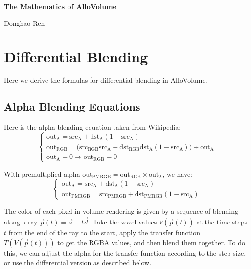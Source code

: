 \documentclass[letter, 11pt]{article}
\newcommand{\mtitle}{The Mathematics of AlloVolume}
\newcommand{\mauthor}{Donghao Ren}
\begin{document}
\thispagestyle{fancy}

\centerline{\Large\textbf{\mtitle}}
\vspace{0.1in}
\centerline{\large{\mauthor}}

\setlength{\parindent}{0cm}

\section{Differential Blending}

Here we derive the formulas for differential blending in AlloVolume.

\subsection{Alpha Blending Equations}

Here is the alpha blending equation taken from Wikipedia:
\begin{equation*}
\begin{cases}
\mathrm{out}_{\mathrm{A}} = \mathrm{src}_{\mathrm{A}} + \mathrm{dst}_{\mathrm{A}} (1 - \mathrm{src}_{\mathrm{A}}) \\
\mathrm{out}_{\mathrm{RGB}} = \bigl( \mathrm{src}_{\mathrm{RGB}} \mathrm{src}_{\mathrm{A}} + \mathrm{dst}_{\mathrm{RGB}} \mathrm{dst}_{\mathrm{A}} \left( 1 - \mathrm{src}_{\mathrm{A}} \right) \bigr) \div \mathrm{out}_{\mathrm{A}} \\
\mathrm{out}_{\mathrm{A}} = 0 \Rightarrow \mathrm{out}_{\mathrm{RGB}} = 0
\end{cases}
\end{equation*}

With premultiplied alpha $ \mathrm{out}_{\mathrm{PMRGB}} = \mathrm{out}_{\mathrm{RGB}} \times \mathrm{out}_{\mathrm{A}} $, we have:
\begin{equation*}
\begin{cases}
\mathrm{out}_{\mathrm{A}} = \mathrm{src}_{\mathrm{A}} + \mathrm{dst}_{\mathrm{A}} (1 - \mathrm{src}_{\mathrm{A}}) \\
\mathrm{out}_{\mathrm{PMRGB}} = \mathrm{src}_{\mathrm{PMRGB}} + \mathrm{dst}_{\mathrm{PMRGB}} \left( 1 - \mathrm{src}_{\mathrm{A}} \right)
\end{cases}
\end{equation*}

The color of each pixel in volume rendering is given by a sequence of blending along a ray $\vec{p}(t) = \vec{s} + t \vec{d}$.
Take the voxel values $V(\vec{p}(t))$ at the time steps $t$ from the end of the ray to the start,
apply the transfer function $T(V(\vec{p}(t)))$ to get the RGBA values, and then blend them together.
To do this, we can adjust the alpha for the transfer function according to the step size,
or use the differential version as described below.
\end{document}
